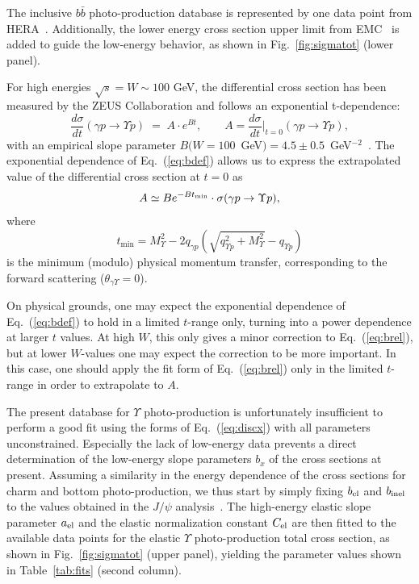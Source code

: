 \documentclass[prd,amsmath,%
twocolumn,floatfix,amssymb, preprintnumbers, linenumbers,nofootinbib, superscriptaddress]{revtex4}
\newcommand{\beq}{\begin{equation}}
\newcommand{\eeq}{\end{equation}}
\begin{document}
The inclusive $b \bar b$ photo-production database is represented by one data point from HERA~\cite{Adloff:1999nr}.
Additionally, the lower energy cross section upper limit from EMC~\cite{Aubert:1981gx}
is added to guide the low-energy behavior, as shown in Fig.~\ref{fig:sigmatot} (lower panel).

For high energies $\sqrt{s} = W\sim100$ GeV, the differential cross section has been measured by the ZEUS Collaboration and follows an exponential t-dependence:
\beq
\frac{d \sigma}{dt} (\gamma p \to \Upsilon p)
\;=\; A \cdot e^{Bt}, \quad \quad 
A = \frac{d \sigma}{dt} \biggr|_{t = 0} (\gamma p \to \Upsilon p) ,
\label{eq:bdef}
\eeq
with an empirical slope parameter $B(W = 100$~GeV$)=4.5\pm0.5$~GeV$^{-2}$~\cite{Chekanov:2009zz}. 
The exponential dependence of Eq.~(\ref{eq:bdef}) allows us to express the extrapolated value
 of the differential cross section at $t=0$ as
\beq
A  \simeq B e^{- B t_{\rm min}} \cdot\sigma (\gamma p \to \Upsilon p),
\label{eq:brel}
\eeq
where
\beq
t_\mathrm{min} = M_\Upsilon^2 - 2q_{\gamma p} \left(\sqrt{q_{\Upsilon p}^2 + M_\Upsilon^2} - q_{\Upsilon p}\right)
\eeq
is the minimum (modulo) physical momentum transfer, corresponding to the forward scattering ($\theta_{\gamma \Upsilon}=0$).

On physical grounds, one may expect the exponential dependence of Eq.~(\ref{eq:bdef}) to hold in a limited $t$-range only, turning into a power dependence at larger $t$ values. At high $W$, this only gives a minor correction to Eq.~(\ref{eq:brel}), but at lower $W$-values one may expect the correction to be more important. 
In this case, one should apply the fit form of Eq.~(\ref{eq:brel}) only in the limited $t$-range in order to extrapolate to $A$. 

The present database for $\Upsilon$ photo-production is unfortunately insufficient to perform a good fit using the forms of Eq.~(\ref{eq:discx}) with all parameters unconstrained.
Especially the lack of low-energy data prevents a direct determination of the low-energy slope parameters $b_x$ of the cross sections at present.
Assuming a similarity in the energy dependence of the 
cross sections for charm and bottom photo-production, 
we thus start by simply fixing $b_{\rm el}$ and 
$b_{\rm inel}$ to the values obtained in the $J/\psi$ analysis~\cite{Gryniuk:2016mpk}. 
The high-energy elastic slope parameter $a_{\rm el}$ and  
the elastic normalization constant $C_{\rm el}$ 
are then fitted to the available data points for the elastic $\Upsilon$ photo-production total cross section, as shown in Fig.~\ref{fig:sigmatot} (upper panel), yielding the parameter values shown in Table~\ref{tab:fits} (second column).  
\end{document}

